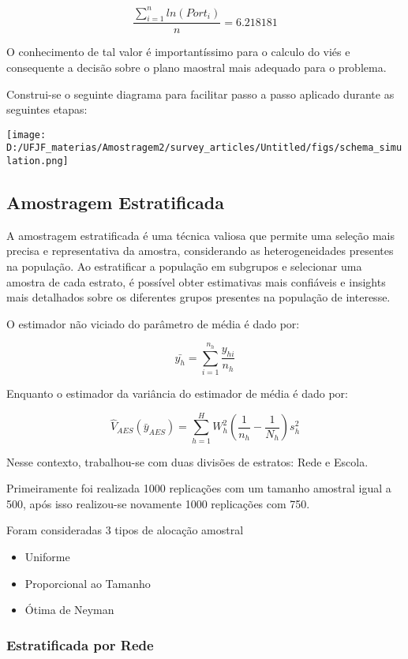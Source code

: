 \documentclass[sn-basic,pdflatex]{sn-jnl}
\theoremstyle{remark}
\theoremstyle{definition}
\begin{document}
\[
\frac{\sum_{i=1}^n{ln(Port_i)}}{n} = 6.218181
\]

O conhecimento de tal valor é importantíssimo para o calculo do viés e
consequente a decisão sobre o plano maostral mais adequado para o
problema.

Construi-se o seguinte diagrama para facilitar passo a passo aplicado
durante as seguintes etapas:

\texttt{[image: D:/UFJF\_materias/Amostragem2/survey\_articles/Untitled/figs/schema\_simulation.png]}

\hypertarget{amostragem-estratificada}{%
\subsection{Amostragem Estratificada}\label{amostragem-estratificada}}

A amostragem estratificada é uma técnica valiosa que permite uma seleção
mais precisa e representativa da amostra, considerando as
heterogeneidades presentes na população. Ao estratificar a população em
subgrupos e selecionar uma amostra de cada estrato, é possível obter
estimativas mais confiáveis e insights mais detalhados sobre os
diferentes grupos presentes na população de interesse.

O estimador não viciado do parâmetro de média é dado por:

\[\bar{y_h} = \sum_{i=1}^{n_h}\frac{y_{hi}}{n_h}\]

Enquanto o estimador da variância do estimador de média é dado por:

\[\hat V_{AES}(\bar y_{AES}) = \sum_{h=1}^{H}W_h^2(\frac{1}{n_h}-\frac{1}{N_h})s_h^2\]

Nesse contexto, trabalhou-se com duas divisões de estratos: Rede e
Escola.

Primeiramente foi realizada 1000 replicações com um tamanho amostral
igual a 500, após isso realizou-se novamente 1000 replicações com 750.

Foram consideradas 3 tipos de alocação amostral

\begin{itemize}
\item
  Uniforme
\item
  Proporcional ao Tamanho
\item
  Ótima de Neyman
\end{itemize}

\hypertarget{estratificada-por-rede}{%
\subsubsection{Estratificada por Rede}\label{estratificada-por-rede}}
\end{document}
